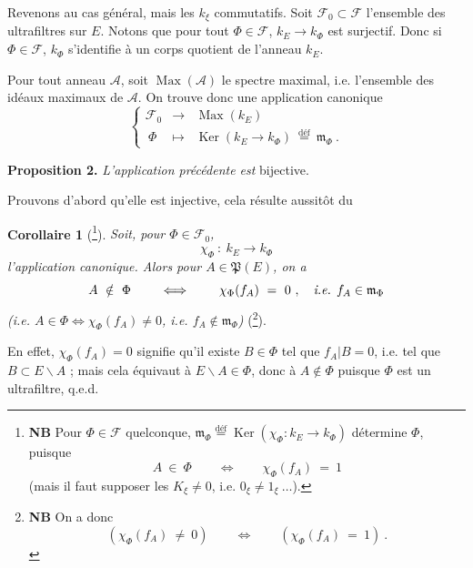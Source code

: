 \documentclass[11pt]{article}
\newcommand{\printedpage}[1]{\marginpar{\footnotesize p.~#1}}
\newcommand{\msp}[1]{\marginpar{\footnotesize [#1]}}
\newcommand{\cF}{\mathcal{F}}
\newcommand{\cA}{\mathcal{A}}
\newcommand{\Ker}{\operatorname{Ker}}
\newcommand{\Max}{\operatorname{Max}}
\newcommand{\defeq}{\overset{\text{déf}}{=}}
\begin{document}
\noindent Revenons au cas général, mais les $k_\xi$ commutatifs. Soit $\cF_0\subset\cF$ l'ensemble des ultrafiltres sur $E$. Notons que pour tout $\Phi\in\cF$, $k_E\longrightarrow k_\Phi$ est surjectif. Donc si $\Phi\in\cF$, $k_\Phi$ s'identifie à un corps quotient de l'anneau $k_E$.

\printedpage{193}

\msp{page 5}
\noindent Pour tout anneau $\cA$, soit $\Max(\cA)$ le spectre maximal, i.e. l'ensemble des idéaux maximaux de $\cA$. On trouve donc une application canonique
\[
\left\{
\begin{array}{lll}
\cF_0 & \longrightarrow & \Max(k_E)\\[1ex]
\ \Phi & \longmapsto & \Ker(k_E\longrightarrow k_\Phi) \ \defeq \ \mathfrak{m}_\Phi \ .
\end{array}\right. \tag*{$(*)$}
\]

\noindent\textbf{Proposition 2.} \textit{L'application précédente est} bijective.

\noindent Prouvons d'abord qu'elle est injective, cela résulte aussitôt du

\noindent\textbf{Corollaire 1} (\footnote[204]{\textbf{NB} Pour $\Phi\in\cF$ quelconque, $\mathfrak{m}_\Phi\defeq\Ker(\chi_\Phi : k_E\longrightarrow k_\Phi)$ détermine $\Phi$, puisque
\[
A \ \in \ \Phi \qquad\iff\qquad \chi_\Phi(f_A) \ = \ 1
\]
(mais il faut supposer les $K_\xi\neq0$, i.e. $0_\xi\neq1_\xi\ \ldots$).}). \textit{Soit, pour $\Phi\in\cF_0$,}
\[
\chi_\Phi \ : \ k_E \longrightarrow k_\Phi
\]
\textit{l'application canonique. Alors pour $A\in\mathfrak{P}(E)$, on a}
\[
A \ \notin \ \Phi \qquad\iff\qquad \chi_\Phi(f_A) \ = \ 0 \ , \quad \text{\textit{i.e.} } f_A\in\mathfrak{m}_\Phi
\]
\textit{(i.e. $A\in\Phi\iff\chi_\Phi(f_A)\neq0$, i.e. $f_A\notin\mathfrak{m}_\Phi$)} (\footnote[205]{\textbf{NB} On a donc
\[
(\chi_\Phi(f_A) \ \neq \ 0) \qquad\iff\qquad (\chi_\Phi(f_A) \ = \ 1) \ .
\]}).

\noindent En effet, $\chi_\Phi(f_A)=0$ signifie qu'il existe $B\in\Phi$ tel que $f_A|B=0$, i.e. tel que $B\subset E\backslash A$ ; mais cela équivaut à $E\backslash A\in\Phi$, donc à $A\notin\Phi$ puisque $\Phi$ est un ultrafiltre, q.e.d.
\end{document}
